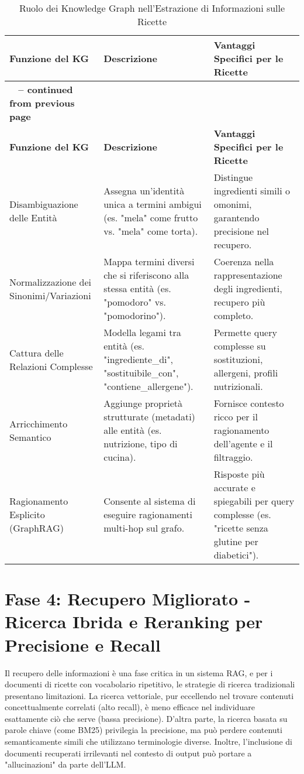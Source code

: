 \documentclass[a4paper, 11pt]{article}
\begin{document}
\begin{longtable}{>{\raggedright\arraybackslash}p{4cm} >{\raggedright\arraybackslash}p{6cm} >{\raggedright\arraybackslash}p{6cm}}
\caption{Ruolo dei Knowledge Graph nell'Estrazione di Informazioni sulle Ricette}\\
\toprule
\textbf{Funzione del KG} & \textbf{Descrizione} & \textbf{Vantaggi Specifici per le Ricette} \\
\midrule
\endfirsthead
\multicolumn{3}{c}%
{{\bfseries \tablename\ \thetable{} -- continued from previous page}} \\
\toprule
\textbf{Funzione del KG} & \textbf{Descrizione} & \textbf{Vantaggi Specifici per le Ricette} \\
\midrule
\endhead
\bottomrule
\endfoot
Disambiguazione delle Entità \cite{entity_linking_wiki} & Assegna un'identità unica a termini ambigui (es. "mela" come frutto vs. "mela" come torta). & Distingue ingredienti simili o omonimi, garantendo precisione nel recupero. \\
\addlinespace
Normalizzazione dei Sinonimi/Variazioni \cite{ingredient_substitutions_kg} & Mappa termini diversi che si riferiscono alla stessa entità (es. "pomodoro" vs. "pomodorino"). & Coerenza nella rappresentazione degli ingredienti, recupero più completo. \\
\addlinespace
Cattura delle Relazioni Complesse \cite{understanding_kg} & Modella legami tra entità (es. "ingrediente\_di", "sostituibile\_con", "contiene\_allergene"). & Permette query complesse su sostituzioni, allergeni, profili nutrizionali. \\
\addlinespace
Arricchimento Semantico \cite{understanding_kg} & Aggiunge proprietà strutturate (metadati) alle entità (es. nutrizione, tipo di cucina). & Fornisce contesto ricco per il ragionamento dell'agente e il filtraggio. \\
\addlinespace
Ragionamento Esplicito (GraphRAG) \cite{graphrag_explained} & Consente al sistema di eseguire ragionamenti multi-hop sul grafo. & Risposte più accurate e spiegabili per query complesse (es. "ricette senza glutine per diabetici"). \\
\end{longtable}

\section{Fase 4: Recupero Migliorato - Ricerca Ibrida e Reranking per Precisione e Recall}
Il recupero delle informazioni è una fase critica in un sistema RAG, e per i documenti di ricette con vocabolario ripetitivo, le strategie di ricerca tradizionali presentano limitazioni. La ricerca vettoriale, pur eccellendo nel trovare contenuti concettualmente correlati (alto recall), è meno efficace nel individuare esattamente ciò che serve (bassa precisione). \cite{meilisearch_vector_dbs} D'altra parte, la ricerca basata su parole chiave (come BM25) privilegia la precisione, ma può perdere contenuti semanticamente simili che utilizzano terminologie diverse. \cite{hybrid_search_vectorchord} Inoltre, l'inclusione di documenti recuperati irrilevanti nel contesto di output può portare a "allucinazioni" da parte dell'LLM. \cite{mastering_rag_reranking}
\end{document}
